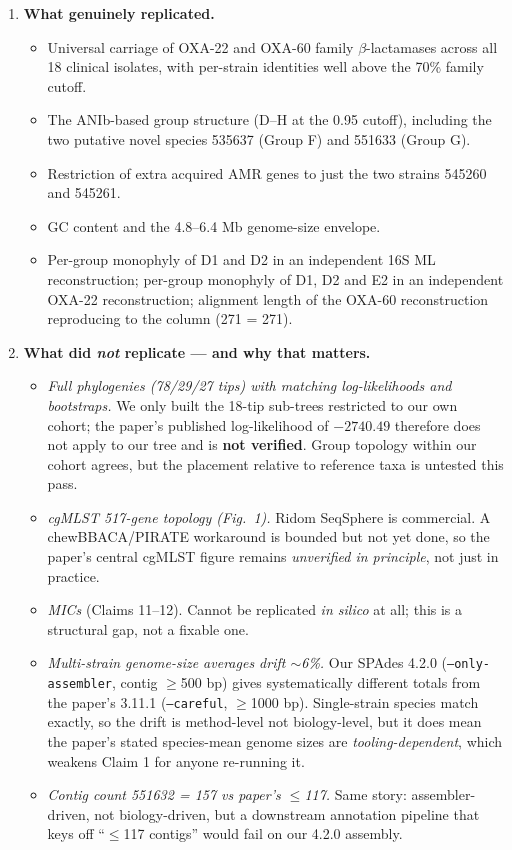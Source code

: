 \documentclass[11pt]{article}
\begin{document}
\begin{enumerate}[leftmargin=1.4em]
  \item \textbf{What genuinely replicated.}
    \begin{itemize}[nosep]
      \item Universal carriage of OXA-22 and OXA-60 family $\beta$-lactamases across all 18 clinical isolates,
            with per-strain identities well above the 70\% family cutoff.
      \item The ANIb-based group structure (D--H at the 0.95 cutoff), including the two putative novel
            species 535637 (Group F) and 551633 (Group G).
      \item Restriction of extra acquired AMR genes to just the two strains 545260 and 545261.
      \item GC content and the 4.8--6.4 Mb genome-size envelope.
      \item Per-group monophyly of D1 and D2 in an independent 16S ML reconstruction; per-group monophyly
            of D1, D2 and E2 in an independent OXA-22 reconstruction; alignment length of the OXA-60
            reconstruction reproducing to the column (271 = 271).
    \end{itemize}

  \item \textbf{What did \emph{not} replicate --- and why that matters.}
    \begin{itemize}[nosep]
      \item \emph{Full phylogenies (78/29/27 tips) with matching log-likelihoods and bootstraps.} We only
            built the 18-tip sub-trees restricted to our own cohort; the paper's published log-likelihood
            of $-2740.49$ therefore does not apply to our tree and is \textbf{not verified}. Group topology
            within our cohort agrees, but the placement relative to reference taxa is untested this pass.
      \item \emph{cgMLST 517-gene topology (Fig.~1).} Ridom SeqSphere is commercial. A chewBBACA/PIRATE
            workaround is bounded but not yet done, so the paper's central cgMLST figure remains
            \emph{unverified in principle}, not just in practice.
      \item \emph{MICs} (Claims 11--12). Cannot be replicated \emph{in silico} at all; this is a
            structural gap, not a fixable one.
      \item \emph{Multi-strain genome-size averages drift $\sim$6\%.} Our SPAdes 4.2.0 (\texttt{--only-assembler},
            contig $\geq$500 bp) gives systematically different totals from the paper's 3.11.1
            (\texttt{--careful}, $\geq$1000 bp). Single-strain species match exactly, so the drift
            is method-level not biology-level, but it does mean the paper's stated species-mean
            genome sizes are \emph{tooling-dependent}, which weakens Claim 1 for anyone re-running it.
      \item \emph{Contig count 551632 = 157 vs paper's $\leq$117.} Same story: assembler-driven,
            not biology-driven, but a downstream annotation pipeline that keys off ``$\leq$117 contigs''
            would fail on our 4.2.0 assembly.
    \end{itemize}


\end{enumerate}
\end{document}
